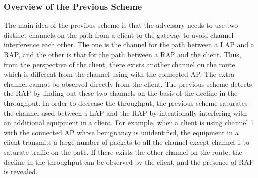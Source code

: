 \documentclass[conference]{IEEEtran}
\begin{document}
\subsubsection{Overview of the Previous Scheme}
The main idea of the previous scheme \cite{previous} is that the adversary needs to use two distinct channels on the path from a client to the gateway to avoid channel interference each other.
The one is the channel for the path between a LAP and a RAP, and the other is that for the path between a RAP and the client.
Thus, from the perspective of the client, there exists another channel on the route which is different from the channel using with the connected AP.
The extra channel cannot be observed directly from the client.
The previous scheme detects the RAP by finding out these two channels on the basis of the decline in the throughput.
In order to decrease the throughput, the previous scheme saturates the channel used between a LAP and the RAP by intentionally interfering with an additional equipment in a client.
For example, when a client is using channel 1 with the connected AP whose benignancy is unidentified, the equipment in a client transmits a large number of packets to all the channel except channel 1 to saturate traffic on the path.
If there exists the other channel on the route, the decline in the throughput can be observed by the client, and the presence of RAP is revealed.
\end{document}
